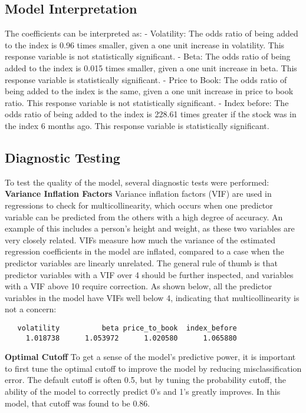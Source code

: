 \documentclass[12pt,twoside]{reedthesis}
\theoremstyle{definition}
\theoremstyle{definition}
\theoremstyle{definition}
\theoremstyle{remark}
\begin{document}
\subsection{Model Interpretation}\label{model-interpretation}

The coefficients can be interpreted as: \hfill\break
- Volatility: The odds ratio of being added to the index is 0.96 times
smaller, given a one unit increase in volatility. This response variable
is not statistically significant. \hfill\break
- Beta: The odds ratio of being added to the index is 0.015 times
smaller, given a one unit increase in beta. This response variable is
statistically significant. \hfill\break
- Price to Book: The odds ratio of being added to the index is the same,
given a one unit increase in price to book ratio. This response variable
is not statistically significant. \hfill\break
- Index before: The odds ratio of being added to the index is 228.61
times greater if the stock was in the index 6 months ago. This response
variable is statistically significant. \hfill\break

\subsection{Diagnostic Testing}\label{diagnostic-testing}

To test the quality of the model, several diagnostic tests were
performed: \hfill\break
\textbf{Variance Inflation Factors} \hfill\break
Variance inflation factors (VIF) are used in regressions to check for
multicollinearity, which occurs when one predictor variable can be
predicted from the others with a high degree of accuracy. An example of
this includes a person's height and weight, as these two variables are
very closely related. VIFs measure how much the variance of the
estimated regression coefficients in the model are inflated, compared to
a case when the predictor variables are linearly unrelated. The general
rule of thumb is that predictor variables with a VIF over 4 should be
further inspected, and variables with a VIF above 10 require correction.
As shown below, all the predictor variables in the model have VIFs well
below 4, indicating that multicollinearity is not a concern:
\begin{verbatim}
   volatility          beta price_to_book  index_before 
     1.018738      1.053972      1.020580      1.065880 
\end{verbatim}
\hfill\break
\textbf{Optimal Cutoff} \hfill\break
To get a sense of the model's predictive power, it is important to first
tune the optimal cutoff to improve the model by reducing
misclassification error. The default cutoff is often 0.5, but by tuning
the probability cutoff, the ability of the model to correctly predict
0's and 1's greatly improves. In this model, that cutoff was found to be
0.86.
\end{document}
